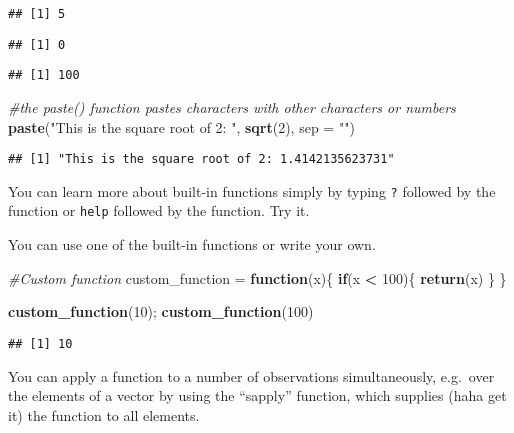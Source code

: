 \documentclass[
]{article}
\newenvironment{Shaded}{\begin{snugshade}}{\end{snugshade}}
\newcommand{\AttributeTok}[1]{\textcolor[rgb]{0.13,0.29,0.53}{#1}}
\newcommand{\CommentTok}[1]{\textcolor[rgb]{0.56,0.35,0.01}{\textit{#1}}}
\newcommand{\ControlFlowTok}[1]{\textcolor[rgb]{0.13,0.29,0.53}{\textbf{#1}}}
\newcommand{\DecValTok}[1]{\textcolor[rgb]{0.00,0.00,0.81}{#1}}
\newcommand{\FunctionTok}[1]{\textcolor[rgb]{0.13,0.29,0.53}{\textbf{#1}}}
\newcommand{\NormalTok}[1]{#1}
\newcommand{\OtherTok}[1]{\textcolor[rgb]{0.56,0.35,0.01}{#1}}
\newcommand{\SpecialCharTok}[1]{\textcolor[rgb]{0.81,0.36,0.00}{\textbf{#1}}}
\newcommand{\StringTok}[1]{\textcolor[rgb]{0.31,0.60,0.02}{#1}}
\begin{document}
\begin{verbatim}
## [1] 5
\end{verbatim}

\begin{verbatim}
## [1] 0
\end{verbatim}

\begin{verbatim}
## [1] 100
\end{verbatim}

\begin{Shaded}
\begin{Highlighting}[]
\CommentTok{\#the paste() function pastes characters with other characters or numbers}
\FunctionTok{paste}\NormalTok{(}\StringTok{"This is the square root of 2: "}\NormalTok{, }\FunctionTok{sqrt}\NormalTok{(}\DecValTok{2}\NormalTok{), }\AttributeTok{sep =} \StringTok{""}\NormalTok{)}
\end{Highlighting}
\end{Shaded}

\begin{verbatim}
## [1] "This is the square root of 2: 1.4142135623731"
\end{verbatim}

You can learn more about built-in functions simply by typing \texttt{?}
followed by the function or \texttt{help} followed by the function. Try
it.

You can use one of the built-in functions or write your own.

\begin{Shaded}
\begin{Highlighting}[]
\CommentTok{\#Custom function }
\NormalTok{custom\_function }\OtherTok{=} \ControlFlowTok{function}\NormalTok{(x)\{}
  \ControlFlowTok{if}\NormalTok{(x }\SpecialCharTok{\textless{}} \DecValTok{100}\NormalTok{)\{}
    \FunctionTok{return}\NormalTok{(x)}
\NormalTok{  \}}
\NormalTok{\}}

\FunctionTok{custom\_function}\NormalTok{(}\DecValTok{10}\NormalTok{); }\FunctionTok{custom\_function}\NormalTok{(}\DecValTok{100}\NormalTok{)}
\end{Highlighting}
\end{Shaded}

\begin{verbatim}
## [1] 10
\end{verbatim}

You can apply a function to a number of observations simultaneously,
e.g.~over the elements of a vector by using the ``sapply'' function,
which supplies (haha get it) the function to all elements.
\end{document}
